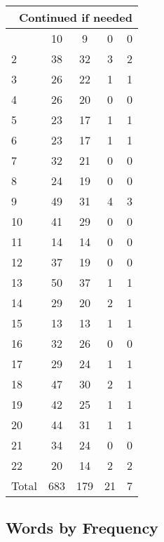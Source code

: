 \begin{center}
\begin{longtable}{l|c|c|c|c}
\hline \multicolumn{5}{|r|}{{Continued if needed}} \\ \hline
\endfoot 
1 & 10 & 9 & 0 & 0\\ \hline
2 & 38 & 32 & 3 & 2\\ \hline
3 & 26 & 22 & 1 & 1\\ \hline
4 & 26 & 20 & 0 & 0\\ \hline
5 & 23 & 17 & 1 & 1\\ \hline
6 & 23 & 17 & 1 & 1\\ \hline
7 & 32 & 21 & 0 & 0\\ \hline
8 & 24 & 19 & 0 & 0\\ \hline
9 & 49 & 31 & 4 & 3\\ \hline
10 & 41 & 29 & 0 & 0\\ \hline
11 & 14 & 14 & 0 & 0\\ \hline
12 & 37 & 19 & 0 & 0\\ \hline
13 & 50 & 37 & 1 & 1\\ \hline
14 & 29 & 20 & 2 & 1\\ \hline
15 & 13 & 13 & 1 & 1\\ \hline
16 & 32 & 26 & 0 & 0\\ \hline
17 & 29 & 24 & 1 & 1\\ \hline
18 & 47 & 30 & 2 & 1\\ \hline
19 & 42 & 25 & 1 & 1\\ \hline
20 & 44 & 31 & 1 & 1\\ \hline
21 & 34 & 24 & 0 & 0\\ \hline
22 & 20 & 14 & 2 & 2\\ \hline
\hline \hline
Total & 683 & 179 & 21 & 7



\end{longtable}
\end{center}

 
\subsection{Words by Frequency}

